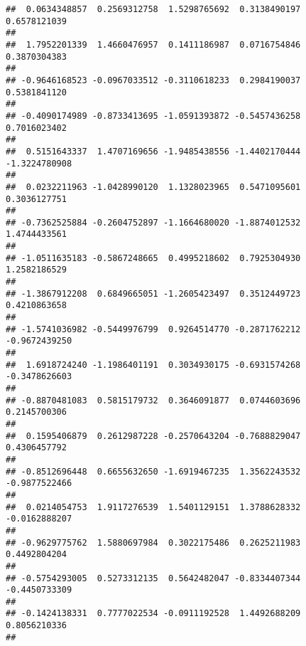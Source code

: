 \documentclass[]{article}
\begin{document}
\begin{verbatim}
##  0.0634348857  0.2569312758  1.5298765692  0.3138490197  0.6578121039 
##                                                                       
##  1.7952201339  1.4660476957  0.1411186987  0.0716754846  0.3870304383 
##                                                                       
## -0.9646168523 -0.0967033512 -0.3110618233  0.2984190037  0.5381841120 
##                                                                       
## -0.4090174989 -0.8733413695 -1.0591393872 -0.5457436258  0.7016023402 
##                                                                       
##  0.5151643337  1.4707169656 -1.9485438556 -1.4402170444 -1.3224780908 
##                                                                       
##  0.0232211963 -1.0428990120  1.1328023965  0.5471095601  0.3036127751 
##                                                                       
## -0.7362525884 -0.2604752897 -1.1664680020 -1.8874012532  1.4744433561 
##                                                                       
## -1.0511635183 -0.5867248665  0.4995218602  0.7925304930  1.2582186529 
##                                                                       
## -1.3867912208  0.6849665051 -1.2605423497  0.3512449723  0.4210863658 
##                                                                       
## -1.5741036982 -0.5449976799  0.9264514770 -0.2871762212 -0.9672439250 
##                                                                       
##  1.6918724240 -1.1986401191  0.3034930175 -0.6931574268 -0.3478626603 
##                                                                       
## -0.8870481083  0.5815179732  0.3646091877  0.0744603696  0.2145700306 
##                                                                       
##  0.1595406879  0.2612987228 -0.2570643204 -0.7688829047  0.4306457792 
##                                                                       
## -0.8512696448  0.6655632650 -1.6919467235  1.3562243532 -0.9877522466 
##                                                                       
##  0.0214054753  1.9117276539  1.5401129151  1.3788628332 -0.0162888207 
##                                                                       
## -0.9629775762  1.5880697984  0.3022175486  0.2625211983  0.4492804204 
##                                                                       
## -0.5754293005  0.5273312135  0.5642482047 -0.8334407344 -0.4450733309 
##                                                                       
## -0.1424138331  0.7777022534 -0.0911192528  1.4492688209  0.8056210336 
##                                                                       

\end{verbatim}
\end{document}
